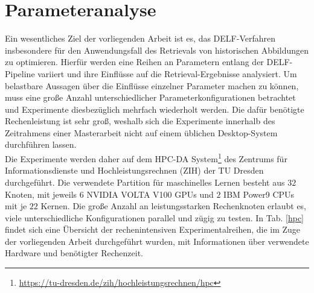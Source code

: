 \section{Parameteranalyse}

Ein wesentliches Ziel der vorliegenden Arbeit ist es, das DELF-Verfahren insbesondere für den Anwendungsfall des Retrievals von historischen Abbildungen zu optimieren. Hierfür werden eine Reihen an Parametern entlang der DELF-Pipeline variiert und ihre Einflüsse auf die Retrieval-Ergebnisse analysiert. Um belastbare Aussagen über die Einflüsse einzelner Parameter machen zu können, muss eine große Anzahl unterschiedlicher Parameterkonfigurationen betrachtet und Experimente diesbezüglich mehrfach wiederholt werden. Die dafür benötigte Rechenleistung ist sehr groß, weshalb sich die Experimente innerhalb des Zeitrahmens einer Masterarbeit nicht auf einem üblichen Desktop-System durchführen lassen.\\
Die Experimente werden daher auf dem HPC-DA System\footnote{\url{https://tu-dresden.de/zih/hochleistungsrechnen/hpc}} des Zentrums für Informationsdienste und Hochleistungsrechnen (ZIH) der TU Dresden durchgeführt. Die verwendete Partition für maschinelles Lernen besteht aus $32$ Knoten, mit jeweils $6$ NVIDIA VOLTA V100 GPUs und $2$ IBM Power9 CPUs mit je $22$ Kernen. Die große Anzahl an leistungsstarken Rechenknoten erlaubt es, viele unterschiedliche Konfigurationen parallel und zügig zu testen.
In Tab. \ref{hpc} findet sich eine Übersicht der rechenintensiven Experimentalreihen, die im Zuge der vorliegenden Arbeit durchgeführt wurden, mit Informationen über verwendete Hardware und benötigter Rechenzeit.

